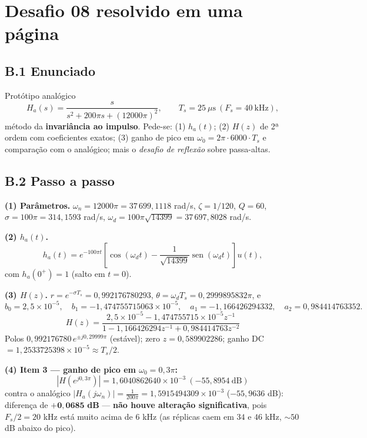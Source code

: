 \section{Desafio 08 resolvido em uma página}\label{ap:desafio}

\subsection*{B.1 Enunciado}

Protótipo analógico
\[
  H_a(s)=\frac{s}{s^2+200\pi s+(12000\pi)^2},
  \qquad T_s=25\ \mu\text{s}\ (F_s=40\ \text{kHz}),
\]
método da \textbf{invariância ao impulso}. Pede-se: (1) $h_a(t)$; (2) $H(z)$ de
2ª ordem com coeficientes exatos; (3) ganho de pico em
$\omega_0=2\pi\cdot6000\cdot T_s$ e comparação com o analógico; mais o
\emph{desafio de reflexão} sobre passa-altas.

\subsection*{B.2 Passo a passo}

\textbf{(1) Parâmetros.} $\omega_n=12000\pi=37\,699{,}1118$ rad/s,
$\zeta=1/120$, $Q=60$, $\sigma=100\pi=314{,}1593$ rad/s,
$\omega_d=100\pi\sqrt{14399}=37\,697{,}8028$ rad/s.

\textbf{(2) $h_a(t)$.}
\[
  h_a(t)=e^{-100\pi t}\left[\cos(\omega_dt)-\frac{1}{\sqrt{14399}}
  \operatorname{sen}(\omega_dt)\right]u(t),
\]
com $h_a(0^+)=1$ (salto em $t=0$).

\textbf{(3) $H(z)$.} $r=e^{-\sigma T_s}=0{,}992176780293$,
$\theta=\omega_dT_s=0{,}2999895832\pi$, e
\[
  b_0=2{,}5\times10^{-5},\quad b_1=-1{,}474755715063\times10^{-5},\quad
  a_1=-1{,}166426294332,\quad a_2=0{,}984414763352 .
\]
\[
  H(z)=\frac{2{,}5\times10^{-5}-1{,}474755715\times10^{-5}z^{-1}}
  {1-1{,}166426294z^{-1}+0{,}984414763z^{-2}}
\]
Polos $0{,}992176780\,e^{\pm j0{,}29999\pi}$ (estável); zero
$z=0{,}589902286$; ganho DC $=1{,}2533725398\times10^{-5}\approx T_s/2$.

\textbf{(4) Item 3 --- ganho de pico em $\omega_0=0{,}3\pi$:}
\[
  \left|H(e^{j0{,}3\pi})\right|=1{,}6040862640\times10^{-3}
  \ (-55{,}8954\ \text{dB})
\]
contra o analógico
$|H_a(j\omega_n)|=\frac{1}{200\pi}=1{,}5915494309\times10^{-3}$
($-55{,}9636$ dB): diferença de
$\mathbf{+0{,}0685}$ \textbf{dB} — \textbf{não houve alteração
significativa}, pois $F_s/2=20$ kHz está muito acima de $6$ kHz (as réplicas
caem em $34$ e $46$ kHz, $\sim50$ dB abaixo do pico).

